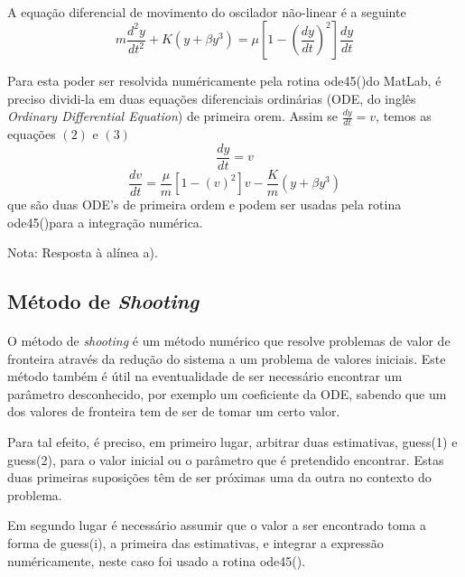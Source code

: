 \documentclass[a4paper, 11pt]{article}
\newcommand{\ode}{{\fontfamily{pcr}\selectfont ode45()}}
\newcommand{\guessi}{{\fontfamily{pcr}\selectfont guess(i)}}
\newcommand{\dydt}{\frac{dy}{dt}}
\newcommand{\overm}[1]{\frac{#1}{m}}
\newcommand{\shooting}{\textit{shooting} }
\newcommand{\Shooting}{\textit{Shooting} }
\begin{document}
	\paragraph{}
	A equação diferencial de movimento do oscilador não-linear é a seguinte
	\begin{equation}
		m\frac{d^2y}{dt^2}+K(y+\beta y^3)=\mu \left[1-\left( \dydt \right)^{2} \right]\dydt
	\end{equation}
	
	Para esta poder ser resolvida numéricamente pela rotina \ode do MatLab, é preciso dividi-la em duas equações diferenciais ordinárias (ODE, do inglês \textit{Ordinary Differential Equation}) de primeira orem. Assim se $\dydt=v$, temos as equações $(2)$ e $(3)$ 
	\begin{equation}
	\dydt = v 
	\end{equation}
	\begin{equation}
	\frac{dv}{dt} =  \overm{\mu} \left[1-\left(v\right)^{2} \right]v-\overm{K}(y+\beta y^3)
	\end{equation}
	que são duas ODE's de primeira ordem e podem ser usadas pela rotina \ode para a integração numérica.
	
	{\footnotesize Nota: Resposta à alínea a).}
	
	\subsection{Método de \Shooting}
	\paragraph{}
	O método de \shooting é um método numérico que resolve problemas de valor de fronteira através da redução do sistema a um problema de valores iniciais. Este método também é útil na eventualidade de ser necessário encontrar um parâmetro desconhecido, por exemplo um coeficiente da ODE, sabendo que um dos valores de fronteira tem de ser de tomar um certo valor.
	
	Para tal efeito, é preciso, em primeiro lugar, arbitrar duas estimativas, {\selectfont guess(1)} e {\selectfont guess(2)}, para o valor inicial ou o parâmetro que é pretendido encontrar. Estas duas primeiras suposições têm de ser próximas uma da outra no contexto do problema.
	
	Em segundo lugar é necessário assumir que o valor a ser encontrado toma a forma de \guessi, a primeira das estimativas, e integrar a expressão numéricamente, neste caso foi usado a rotina \ode.
	
\end{document}
